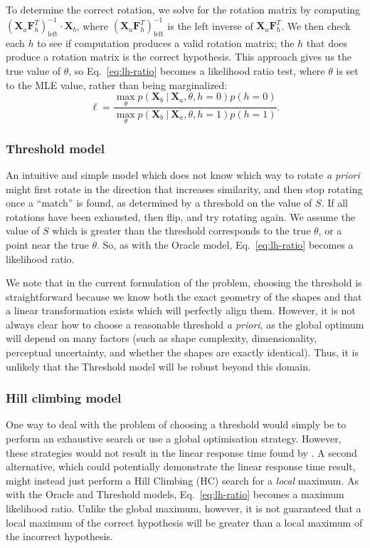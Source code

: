 \documentclass[10pt,letterpaper]{article}
\newcommand{\Xa}[0]{\mathbf{X}_a}
\newcommand{\Xb}[0]{\mathbf{X}_b}
\newcommand{\F}[0]{\mathbf{F}}
\newcommand{\hi}[0]{h=0}
\newcommand{\hf}[0]{h=1}
\newcommand{\Oc}[0]{Oracle}
\newcommand{\Th}[0]{Threshold}
\newcommand{\Hc}[0]{HC}
\begin{document}
To determine the correct rotation, we solve for the rotation matrix by
computing $(\Xa \F_h^T)_\mathrm{left}^{-1}\cdot{}\Xb$, where
$(\Xa\F_h^T)_\mathrm{left}^{-1}$ is the left inverse of
$\Xa\F_h^T$. We then check each $h$ to see if computation produces a
valid rotation matrix; the $h$ that does produce a rotation matrix is
the correct hypothesis. This approach gives us the true value of
$\theta$, so Eq.~\ref{eq:lh-ratio} becomes a likelihood ratio test,
where $\theta$ is set to the MLE value, rather than being
marginalized:
\begin{equation}
  \ell = \frac{\max_\theta p(\Xb\ \vert\ \Xa, \theta, \hi)p(\hi)}{\max_\theta p(\Xb\ \vert\ \Xa, \theta, \hf)p(\hf)}.
  \label{eq:mle-lh-ratio}
\end{equation}

\subsubsection{Threshold model}

An intuitive and simple model which does not know which way to rotate
\textit{a priori} might first rotate in the direction that increases
similarity, and then stop rotating once a ``match'' is found, as
determined by a threshold on the value of $S$. If all rotations have
been exhausted, then flip, and try rotating again. We assume the value
of $S$ which is greater than the threshold corresponds to the true
$\theta$, or a point near the true $\theta$. So, as with the \Oc{}
model, Eq.~\ref{eq:lh-ratio} becomes a likelihood ratio.

We note that in the current formulation of the problem, choosing the
threshold is straightforward because we know both the exact geometry
of the shapes and that a linear transformation exists which will
perfectly align them. However, it is not always clear how to choose a
reasonable threshold \textit{a priori}, as the global optimum will
depend on many factors (such as shape complexity, dimensionality,
perceptual uncertainty, and whether the shapes are exactly
identical). Thus, it is unlikely that the \Th{} model will be robust
beyond this domain.

\subsubsection{Hill climbing model}

One way to deal with the problem of choosing a threshold would simply
be to perform an exhaustive search or use a global optimisation
strategy. However, these strategies would not result in the linear
response time found by . A second alternative,
which could potentially demonstrate the linear response time result,
might instead just perform a Hill Climbing (\Hc{}) search for a
\textit{local} maximum. As with the \Oc{} and \Th{} models,
Eq.~\ref{eq:lh-ratio} becomes a maximum likelihood ratio. Unlike the
global maximum, however, it is not guaranteed that a local maximum of
the correct hypothesis will be greater than a local maximum of the
incorrect hypothesis.
\end{document}
